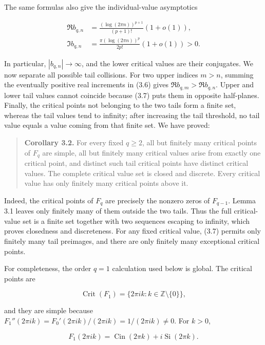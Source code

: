 \documentclass[11pt]{article}
\theoremstyle{keio}
\theoremstyle{definition}
\theoremstyle{remark}
\begin{document}
The same formulas also give the individual-value asymptotics

\[
 \begin{aligned}
 \Re b_{q,n}
 &=\frac{(\log(2\pi n))^{p+1}}{(p+1)!}(1+o(1)),\\
 \Im b_{q,n}
 &=\frac{\pi(\log(2\pi n))^p}{2p!}(1+o(1))>0.
 \end{aligned}
\tag{Inv-3.7}
\]

In particular, \(|b_{q,n}|\to\infty\), and the lower critical values are
their conjugates. We now separate all possible tail collisions. For two
upper indices \(m>n\), summing the eventually positive real increments in
(3.6) gives \(\Re b_{q,m}>\Re b_{q,n}\). Upper and lower tail values cannot
coincide because (3.7) puts them in opposite half-planes. Finally, the
critical points not belonging to the two tails form a finite set, whereas
the tail values tend to infinity; after increasing the tail threshold, no
tail value equals a value coming from that finite set. We have proved:

\begin{quote}
\textbf{Corollary 3.2.} For every fixed \(q\geq2\), all but finitely many
critical points of \(F_q\) are simple, all but finitely many critical
values arise from exactly one critical point, and distinct such tail
critical points have distinct critical values. The complete critical
value set is closed and discrete. Every critical value has only finitely
many critical points above it.
\end{quote}

Indeed, the critical points of \(F_q\) are precisely the nonzero zeros of
\(F_{q-1}\). Lemma 3.1 leaves only finitely many of them outside the two
tails. Thus the full critical-value set is a finite set together with two
sequences escaping to infinity, which proves closedness and discreteness.
For any fixed critical value, (3.7) permits only finitely many tail
preimages, and there are only finitely many exceptional critical points.

For completeness, the order \(q=1\) calculation used below is global. The
critical points are

\[
 \operatorname{Crit}(F_1)=\{2\pi ik:k\in\mathbb Z\setminus\{0\}\},
\]

and they are simple because
\(F_1''(2\pi ik)=F_0'(2\pi ik)/(2\pi ik)=1/(2\pi ik)\ne0\). For \(k>0\),

\[
 F_1(2\pi ik)=\operatorname{Cin}(2\pi k)
              +i\operatorname{Si}(2\pi k).
\tag{Inv-3.8}
\]
\end{document}
